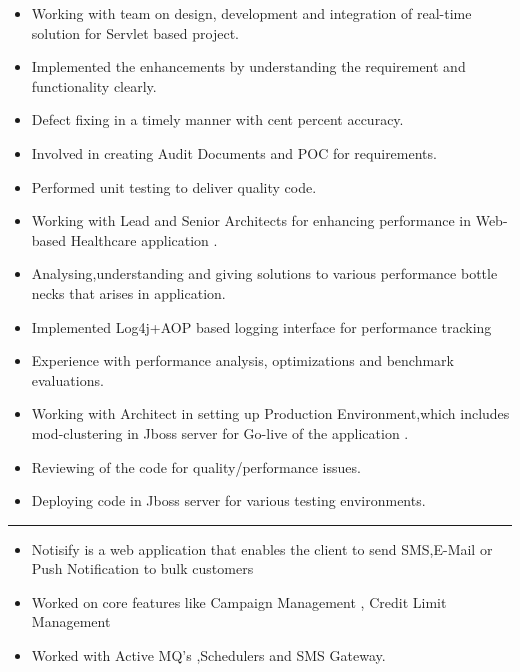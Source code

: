 \documentclass[10pt,a4paper,ragged2e]{altacv}
\begin{document}

\begin{itemize}
\item Working with team on design, development and integration of real-time solution for Servlet based project.
\small
\item Implemented the enhancements by understanding the requirement and functionality clearly.
\small
\item Defect fixing in a timely manner with cent percent accuracy.
\small
\item Involved in creating  Audit Documents and POC for requirements.
\small
\item Performed unit testing to deliver quality code.
\end{itemize}

\divider




\smallskip
{}

\begin{itemize}
\item Working with Lead and Senior Architects for enhancing performance in Web-based Healthcare application .
\small
\item Analysing,understanding and giving solutions to various performance bottle necks that arises in application.
\small
\item Implemented Log4j+AOP based logging interface for performance  tracking
\small
\item Experience with performance analysis, optimizations and benchmark evaluations.
\small
\item Working with Architect in setting up Production Environment,which includes mod-clustering in Jboss server for Go-live of the application .
\small
\item Reviewing of the code for quality/performance issues.
\small
\item Deploying code in Jboss server for various testing environments.  
\end{itemize}



\rule{\linewidth}{1pt}




\begin{itemize}
\item Notisify is a web application that enables the client to send SMS,E-Mail or Push Notification to bulk customers
\small
\item Worked on core features like Campaign Management , Credit Limit Management 
\small
\item Worked with Active MQ's ,Schedulers and SMS Gateway.  
\end{itemize}
\divider
\end{document}
